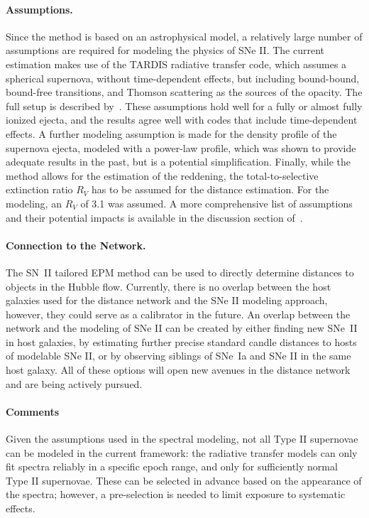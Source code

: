\paragraph{Assumptions.}
Since the method is based on an astrophysical model, a relatively large number of assumptions are required for modeling the physics of SNe II. The current estimation makes use of the TARDIS radiative transfer code, which assumes a spherical supernova, without time-dependent effects, but including bound-bound, bound-free transitions, and Thomson scattering as the sources of the opacity. The full setup is described by~\citet{2019A&A...621A..29V}. These assumptions hold well for a fully or almost fully ionized ejecta, and the results agree well with codes that include time-dependent effects. 
A further modeling assumption is made for the density profile of the supernova ejecta, modeled with a power-law profile, which was shown to provide adequate results in the past, but is a potential simplification.
Finally, while the method allows for the estimation of the reddening, the total-to-selective extinction ratio $R_V$ has to be assumed for the distance estimation. For the modeling, an $R_V$ of 3.1 was assumed. A more comprehensive list of assumptions and their potential impacts is available in the discussion section of~\citep{2025AA...702A..41V}.

\paragraph{Connection to the Network.}
The SN~II tailored EPM method can be used to directly determine distances to objects in the Hubble flow.  Currently, there is no overlap between the host galaxies used for the distance network and the SNe II modeling approach, however, they could serve as a calibrator in the future. An overlap between the network and the modeling of SNe II can be created by either finding new SNe~II in host galaxies, by estimating further precise standard candle distances to hosts of modelable SNe II, or by observing siblings of SNe~Ia and SNe II in the same host galaxy.  All of these options will open new avenues in the distance network and are being actively pursued.

\paragraph{Comments}
Given the assumptions used in the spectral modeling, not all Type II supernovae can be modeled in the current framework: the radiative transfer models can only fit spectra reliably in a specific epoch range, and only for sufficiently normal Type II supernovae. These can be selected in advance based on the appearance of the spectra; however, a pre-selection is needed to limit exposure to systematic effects. 

